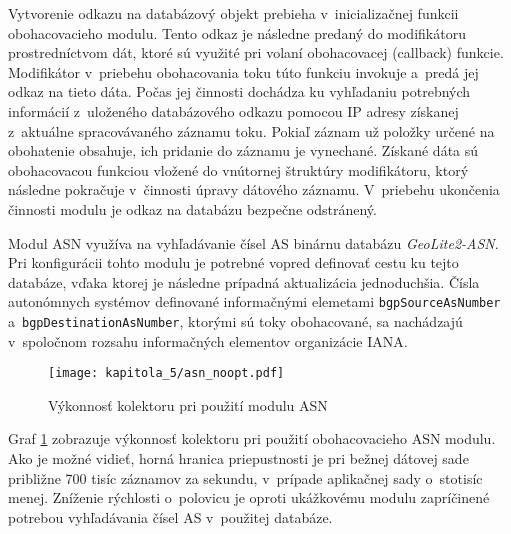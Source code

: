 Vytvorenie odkazu na databázový objekt prebieha v~inicializačnej funkcii obohacovacieho modulu. Tento odkaz je následne predaný do modifikátoru prostredníctvom dát, ktoré sú využité pri volaní obohacovacej (callback) funkcie. Modifikátor v~priebehu obohacovania toku túto funkciu invokuje a~predá
jej odkaz na tieto dáta. Počas jej činnosti dochádza ku vyhľadaniu potrebných informácií z~uloženého databázového odkazu pomocou IP adresy získanej z~aktuálne spracovávaného záznamu toku. Pokiaľ záznam už položky určené na obohatenie obsahuje, ich pridanie do záznamu je vynechané.
Získané dáta sú obohacovacou funkciou vložené do vnútornej štruktúry modifikátoru, ktorý následne pokračuje v~činnosti úpravy dátového záznamu. V~priebehu ukončenia činnosti modulu je odkaz na databázu bezpečne odstránený.

Modul ASN využíva na vyhľadávanie čísel AS binárnu databázu \textit{GeoLite2-ASN}. Pri konfigurácii tohto modulu je potrebné vopred definovať cestu ku tejto databáze, vďaka ktorej je následne prípadná aktualizácia jednoduchšia.
Čísla autonómnych systémov definované informačnými elemetami \texttt{bgpSourceAsNumber} a~\texttt{bgpDestinationAsNumber}, ktorými sú toky obohacované, sa nachádzajú v~spoločnom rozsahu informačných elementov organizácie IANA.

\vspace{-1em}
\begin{figure}[ht]
    \centering
    \texttt{[image: kapitola\_5/asn\_noopt.pdf]}
    \caption{Výkonnosť kolektoru pri použití modulu ASN}
    \label{fig:tests_asn_noopt}
\end{figure}

Graf \ref{fig:tests_asn_noopt} zobrazuje výkonnosť kolektoru pri použití obohacovacieho ASN modulu. Ako je možné vidieť, horná hranica priepustnosti je pri bežnej dátovej sade približne 700 tisíc záznamov za sekundu, v~prípade
aplikačnej sady o~stotisíc menej. Zníženie rýchlosti o~polovicu je oproti ukážkovému modulu zapríčinené potrebou vyhľadávania čísel AS v~použitej databáze.

